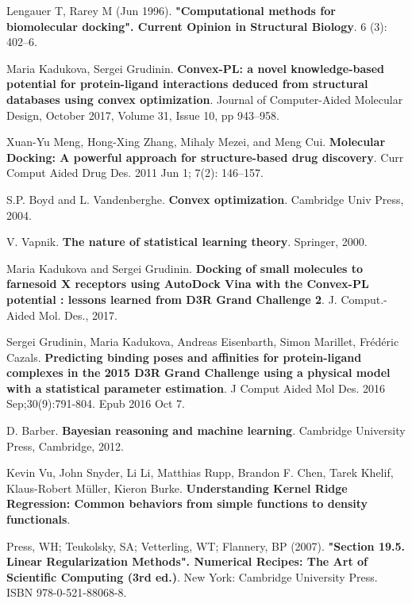 \documentclass[12pt,twoside]{article}
\begin{document}
\begin{thebibliography}{1}
	Lengauer T, Rarey M (Jun 1996).  
	\textbf{"Computational methods for biomolecular docking". Current Opinion in Structural Biology}. 
	6 (3): 402–6.
	
	Maria Kadukova, Sergei Grudinin.
	\textbf{Convex-PL: a novel knowledge-based potential for protein-ligand interactions deduced from structural databases using convex optimization}.
	Journal of Computer-Aided Molecular Design, October 2017, Volume 31, Issue 10, pp 943–958.
	
	Xuan-Yu Meng, Hong-Xing Zhang, Mihaly Mezei, and Meng Cui.
	\textbf{Molecular Docking: A powerful approach for structure-based drug discovery}.
	Curr Comput Aided Drug Des. 2011 Jun 1; 7(2): 146–157.
	
	S.P. Boyd and L. Vandenberghe.
	\textbf{Convex optimization}.
	Cambridge Univ Press, 2004.
	
	V. Vapnik.
	\textbf{The nature of statistical learning theory}.
	Springer, 2000.
	
	Maria Kadukova and Sergei Grudinin.
	\textbf{Docking of small molecules to farnesoid X receptors using AutoDock Vina with the Convex-PL potential : lessons learned from D3R Grand Challenge 2}.
	J. Comput.-Aided Mol. Des., 2017. 
	
	Sergei Grudinin, Maria Kadukova, Andreas Eisenbarth, Simon Marillet, Frédéric Cazals.
	\textbf{Predicting binding poses and affinities for protein-ligand complexes in the 2015 D3R Grand Challenge using a physical model with a statistical parameter estimation}.
	J Comput Aided Mol Des. 2016 Sep;30(9):791-804. Epub 2016 Oct 7.
	
	D. Barber.
	\textbf{Bayesian reasoning and machine learning}.
	Cambridge University Press, Cambridge, 2012.
	
	Kevin Vu, John Snyder, Li Li, Matthias Rupp, Brandon F. Chen, Tarek Khelif, Klaus-Robert Müller, Kieron Burke.
	\textbf{Understanding Kernel Ridge Regression: Common behaviors from simple functions to density functionals}.
	
	Press, WH; Teukolsky, SA; Vetterling, WT; Flannery, BP (2007).
	\textbf{"Section 19.5. Linear Regularization Methods". Numerical Recipes: The Art of Scientific Computing (3rd ed.)}.
	New York: Cambridge University Press. ISBN 978-0-521-88068-8.
	

\end{thebibliography}
\end{document}
